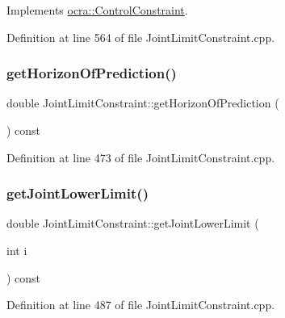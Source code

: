 Implements \hyperlink{classocra_1_1ControlConstraint_adbd15b36773c775a06a0b7bde46ec799}{ocra\+::\+Control\+Constraint}.



Definition at line 564 of file Joint\+Limit\+Constraint.\+cpp.

\hypertarget{classocra_1_1JointLimitConstraint_af7d78cabe18ed94eb2f2efa61efa8516}{}\label{classocra_1_1JointLimitConstraint_af7d78cabe18ed94eb2f2efa61efa8516} 
\subsubsection{\texorpdfstring{get\+Horizon\+Of\+Prediction()}{getHorizonOfPrediction()}}
{\footnotesize\ttfamily double Joint\+Limit\+Constraint\+::get\+Horizon\+Of\+Prediction (\begin{DoxyParamCaption}{ }\end{DoxyParamCaption}) const}



Definition at line 473 of file Joint\+Limit\+Constraint.\+cpp.

\hypertarget{classocra_1_1JointLimitConstraint_a4140ce4adf0c699b65ab1f9d33b4d487}{}\label{classocra_1_1JointLimitConstraint_a4140ce4adf0c699b65ab1f9d33b4d487} 
\subsubsection{\texorpdfstring{get\+Joint\+Lower\+Limit()}{getJointLowerLimit()}}
{\footnotesize\ttfamily double Joint\+Limit\+Constraint\+::get\+Joint\+Lower\+Limit (\begin{DoxyParamCaption}\item[{int}]{i }\end{DoxyParamCaption}) const}



Definition at line 487 of file Joint\+Limit\+Constraint.\+cpp.

\hypertarget{classocra_1_1JointLimitConstraint_a207e245abf812538eacf10fb9d9e704d}{}\label{classocra_1_1JointLimitConstraint_a207e245abf812538eacf10fb9d9e704d} 
